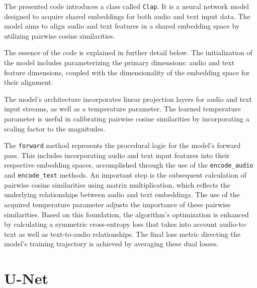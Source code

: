 The presented code introduces a class called \texttt{Clap}. It is a neural network model designed to acquire shared embeddings for both audio and text input data. The model aims to align audio and text features in a shared embedding space by utilizing pairwise cosine similarities. 

The essence of the code is explained in further detail below. The initialization of the model includes parameterizing the primary dimensions: audio and text feature dimensions, coupled with the dimensionality of the embedding space for their alignment.

The model's architecture incorporates linear projection layers for audio and text input streams, as well as a temperature parameter.  The learned temperature parameter is useful in calibrating pairwise cosine similarities by incorporating a scaling factor to the magnitudes.

The \texttt{forward} method represents the procedural logic for the model's forward pass. This includes incorporating audio and text input features into their respective embedding spaces, accomplished through the use of the \texttt{encode\_audio} and \texttt{encode\_text} methods. An important step is the subsequent calculation of pairwise cosine similarities using matrix multiplication, which reflects the underlying relationships between audio and text embeddings. The use of the acquired temperature parameter adjusts the importance of these pairwise similarities. Based on this foundation, the algorithm's optimization is enhanced by calculating a symmetric cross-entropy loss that takes into account audio-to-text as well as text-to-audio relationships. The final loss metric directing the model's training trajectory is achieved by averaging these dual losses.

\section{U-Net}


